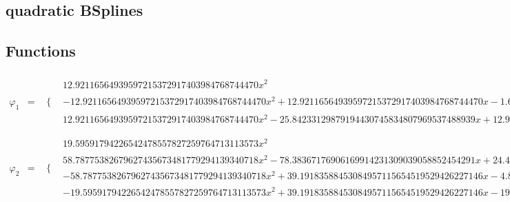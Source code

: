 \documentclass{article}
\begin{document}
 

\begin{landscape}
\section{quadratic BSplines}
\subsection{Functions}\begin{eqnarray*} \varphi_1 & = & \begin{array}{cc}
 \{ & 
\begin{array}{cc}
 12.92116564939597215372917403984768744470 x^2 & x\geq 0\land x<\frac{1}{4} \\
 -12.92116564939597215372917403984768744470 x^2+12.92116564939597215372917403984768744470 x-1.615145706174496519216146754980960930587 & \left(x\geq \frac{1}{2}\land x<\frac{3}{4}\right)\lor \left(x\geq \frac{1}{4}\land x<\frac{1}{2}\right) \\
 12.92116564939597215372917403984768744470 x^2-25.84233129879194430745834807969537488939 x+12.92116564939597215372917403984768744470 & x\geq \frac{3}{4}\land x<1
\end{array}

\end{array}\\
\varphi_2 & = & \begin{array}{cc}
 \{ & 
\begin{array}{cc}
 19.59591794226542478557827259764713113573 x^2 & x\geq 0\land x<\frac{1}{4} \\
 58.78775382679627435673481779294139340718 x^2-78.38367176906169914231309039058852454291 x+24.49489742783178098197284074705891391966 & x\geq \frac{1}{2}\land x<\frac{3}{4} \\
 -58.78775382679627435673481779294139340718 x^2+39.19183588453084957115654519529426227146 x-4.898979485566356196394568149411782783932 & x\geq \frac{1}{4}\land x<\frac{1}{2} \\
 -19.59591794226542478557827259764713113573 x^2+39.19183588453084957115654519529426227146 x-19.59591794226542478557827259764713113573 & x\geq \frac{3}{4}\land x<1
\end{array}


\end{array}
\end{eqnarray*}
\end{landscape}
\end{document}
